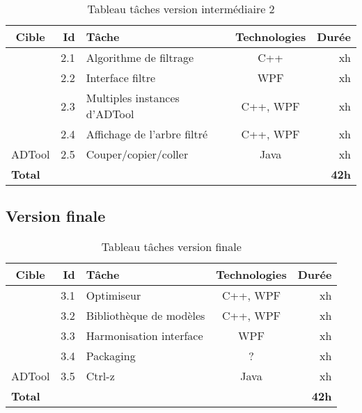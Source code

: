 		\begin{table}
			\centering
			\begin{tabular}{|c|r|l|c|r|}
				\hline
				\textbf{Cible} & \textbf{Id} & \textbf{Tâche} & \textbf{Technologies} & \textbf{Durée}\\
				\hline

				\multirow{4}{*}{\glasir{}} & 2.1 & Algorithme de filtrage & C++ & xh\\
				\cline{2-5}
				 & 2.2 & Interface filtre & WPF & xh\\
				\cline{2-5}
				 & 2.3 & Multiples instances d'ADTool & C++, WPF & xh\\
				\cline{2-5}
				 & 2.4 & Affichage de l'arbre filtré & C++, WPF & xh\\
				\hline

				\multirow{1}{*}{ADTool} & 2.5 & Couper/copier/coller & \multirow{1}{*}{Java} & xh\\
				\hline

				\multicolumn{4}{|l|}{\bf Total} & {\bf 42h}\\
				\hline
			\end{tabular}
			\caption{Tableau tâches version intermédiaire 2}
			\label{fig:taches_units_2}
		\end{table}

	\subsection{Version finale}

		\begin{table}
			\centering
			\begin{tabular}{|c|r|l|c|r|}
				\hline
				\textbf{Cible} & \textbf{Id} & \textbf{Tâche} & \textbf{Technologies} & \textbf{Durée}\\
				\hline

				\multirow{4}{*}{\glasir{}} & 3.1 & Optimiseur & C++, WPF & xh\\
				\cline{2-5}
				 & 3.2 & Bibliothèque de modèles & C++, WPF & xh\\
				\cline{2-5}
				 & 3.3 & Harmonisation interface & WPF & xh\\
				\cline{2-5}
				 & 3.4 & Packaging & ? & xh\\
				\hline

				\multirow{1}{*}{ADTool} & 3.5 & Ctrl-z & \multirow{1}{*}{Java} & xh\\
				\hline

				\multicolumn{4}{|l|}{\bf Total} & {\bf 42h}\\
				\hline
			\end{tabular}
			\caption{Tableau tâches version finale}
			\label{fig:taches_units_3}
		\end{table}